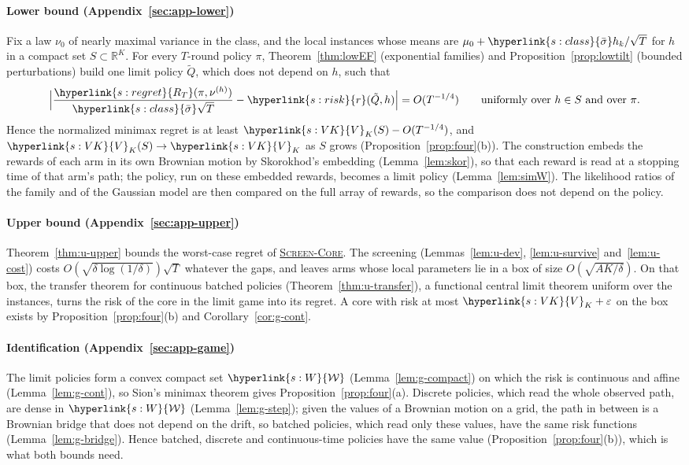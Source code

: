 \documentclass[11pt]{article}
\DeclareRobustCommand{\sy}[2]{{\hyperlink{#1}{#2}}}
\newcommand{\R}{\mathbb{R}}
\newcommand{\1}{\mathbf{1}}
\newcommand{\RT}{\sy{s:regret}{R_T}}
\newcommand{\sbar}{\sy{s:class}{\bar\sigma}}
\newcommand{\Wc}{\sy{s:W}{\mathcal W}}
\newcommand{\rk}{\sy{s:risk}{r}}
\newcommand{\VK}{\sy{s:VK}{V}}
\newcommand{\SC}{\sy{alg:sc}{\textsc{Screen-Core}}}
\begin{document}
\paragraph{Lower bound (Appendix~\ref{sec:app-lower})} Fix a law $\nu_0$ of nearly maximal variance in the class, and the local instances whose means are
$\mu_0+\sbar h_k/\sqrt T$ for $h$ in a compact set $S\subset\R^K$. For every $T$-round policy $\pi$, Theorem~\ref{thm:lowEF} (exponential families) and
Proposition~\ref{prop:lowtilt} (bounded perturbations) build one limit policy $\tilde Q$, which does not depend on $h$, such that
\begin{equation*}
\Big|\frac{\RT(\pi,\nu^{(h)})}{\sbar\sqrt T}-\rk(\tilde Q,h)\Big|=O(T^{-1/4})\qquad\text{uniformly over }h\in S\text{ and over }\pi .
\end{equation*}
Hence the normalized minimax regret is at least $\VK_K(S)-O(T^{-1/4})$, and $\VK_K(S)\to\VK_K$ as $S$ grows (Proposition~\ref{prop:four}(b)). The
construction embeds the rewards of each arm in its own Brownian motion by Skorokhod's embedding (Lemma~\ref{lem:skor}), so that each reward is read at a
stopping time of that arm's path; the policy, run on these embedded rewards, becomes a limit policy (Lemma~\ref{lem:simW}). The likelihood ratios of the
family and of the Gaussian model are then compared on the full array of rewards, so the comparison does not depend on the policy.

\paragraph{Upper bound (Appendix~\ref{sec:app-upper})} Theorem~\ref{thm:u-upper} bounds the worst-case regret of \SC. The screening (Lemmas~\ref{lem:u-dev},
\ref{lem:u-survive} and~\ref{lem:u-cost}) costs $O(\sqrt{\delta\log(1/\delta)})\sqrt T$ whatever the gaps, and leaves arms whose local parameters lie in a box of
size $O(\sqrt{AK/\delta})$. On that box, the transfer theorem for continuous batched policies (Theorem~\ref{thm:u-transfer}), a functional central limit
theorem uniform over the instances, turns the risk of the core in the limit game into its regret. A core with risk at most $\VK_K+\varepsilon$ on the box
exists by Proposition~\ref{prop:four}(b) and Corollary~\ref{cor:g-cont}.

\paragraph{Identification (Appendix~\ref{sec:app-game})} The limit policies form a convex compact set $\Wc$ (Lemma~\ref{lem:g-compact}) on which the risk is
continuous and affine (Lemma~\ref{lem:g-cont}), so Sion's minimax theorem gives Proposition~\ref{prop:four}(a). Discrete policies, which read the whole
observed path, are dense in $\Wc$ (Lemma~\ref{lem:g-step}); given the values of a Brownian motion on a grid, the path in between is a Brownian bridge that
does not depend on the drift, so batched policies, which read only these values, have the same risk functions (Lemma~\ref{lem:g-bridge}). Hence batched,
discrete and continuous-time policies have the same value (Proposition~\ref{prop:four}(b)), which is what both bounds need.
\end{document}
